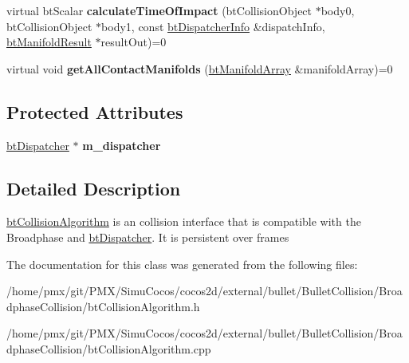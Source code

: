 \begin{DoxyCompactItemize}
\item 
\mbox{\label{classbtCollisionAlgorithm_aea5afdcbb1266af69a44f05e9866edad}} 
virtual bt\+Scalar {\bfseries calculate\+Time\+Of\+Impact} (bt\+Collision\+Object $\ast$body0, bt\+Collision\+Object $\ast$body1, const \hyperlink{structbtDispatcherInfo}{bt\+Dispatcher\+Info} \&dispatch\+Info, \hyperlink{classbtManifoldResult}{bt\+Manifold\+Result} $\ast$result\+Out)=0
\item 
\mbox{\label{classbtCollisionAlgorithm_a224203965d0115e088db5f8aa8bd11a5}} 
virtual void {\bfseries get\+All\+Contact\+Manifolds} (\hyperlink{classbtAlignedObjectArray}{bt\+Manifold\+Array} \&manifold\+Array)=0
\end{DoxyCompactItemize}
\subsection*{Protected Attributes}
\begin{DoxyCompactItemize}
\item 
\mbox{\label{classbtCollisionAlgorithm_a5a507f3e07fe25885a8f0593706f36bf}} 
\hyperlink{classbtDispatcher}{bt\+Dispatcher} $\ast$ {\bfseries m\+\_\+dispatcher}
\end{DoxyCompactItemize}


\subsection{Detailed Description}
\hyperlink{classbtCollisionAlgorithm}{bt\+Collision\+Algorithm} is an collision interface that is compatible with the Broadphase and \hyperlink{classbtDispatcher}{bt\+Dispatcher}. It is persistent over frames 

The documentation for this class was generated from the following files\+:\begin{DoxyCompactItemize}
\item 
/home/pmx/git/\+P\+M\+X/\+Simu\+Cocos/cocos2d/external/bullet/\+Bullet\+Collision/\+Broadphase\+Collision/bt\+Collision\+Algorithm.\+h\item 
/home/pmx/git/\+P\+M\+X/\+Simu\+Cocos/cocos2d/external/bullet/\+Bullet\+Collision/\+Broadphase\+Collision/bt\+Collision\+Algorithm.\+cpp\end{DoxyCompactItemize}
